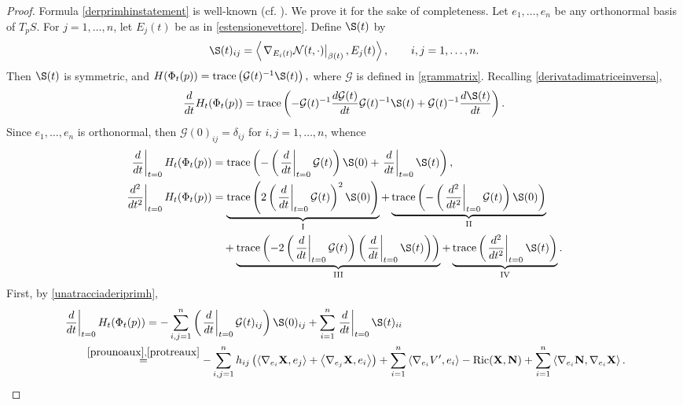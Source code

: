 \documentclass[11pt]{amsart}
\newcommand{\n}[1]{\nabla^\varepsilon_{ #1 }}
\newcommand{\N}{\mathcal N}
\renewcommand{\k}{\kappa}
\newcommand{\X}{\mathbf{X}}
\renewcommand{\n}{\mathbf{N}}
\newcommand{\G}{\mathcal G}
\DeclareMathOperator{\ric}{Ric}
\DeclareMathOperator{\trace}{trace}
\theoremstyle{definition}
\theoremstyle{remark}
\numberwithin{equation}{section}
\begin{document}
\begin{proof}
Formula \eqref{derprimhinstatement} is well-known (cf. \cite[Lemma 1.26]{MR4676392}). We prove it for the sake of completeness. 
    Let $e_1,\ldots,e_n$ be any orthonormal basis of $T_p S$. 
    For $j=1,\ldots,n$, let $E_j(t)$ be as in \eqref{estensionevettore}. Define $\S(t)$ by
    \begin{equation*}
       \S(t)_{ij}=\left\langle\left.\nabla_{E_i(t)}\N(t,\cdot)\right|_{\beta(t)},E_j(t)\right\rangle,\qquad i,j=1,\ldots,n.
    \end{equation*}
    Then $\S(t)$ is symmetric, and $       H(\Phi_t(p))=\trace\left(\G(t)^{-1}\S(t)\right),$
   where $\G$ is defined in \eqref{grammatrix}. 
   Recalling \eqref{derivatadimatriceinversa},
    \begin{equation*}
        \frac{d}{dt}H_t(\Phi_t(p))=\trace\left(-\G(t)^{-1}\frac{d\G(t)}{dt}\G(t)^{-1}\S(t)+\G(t)^{-1}\frac{d\S(t)}{dt}\right).
    \end{equation*}
Since $e_1,\ldots,e_n$ is orthonormal, then $\G(0)_{ij}=\delta_{ij}$ for $i,j=1,\ldots,n$, whence
\begin{align}
     \left.\frac{d}{dt}\right|_{t=0}H_t(\Phi_t(p))&=\trace\left(-\left(\left.\frac{d}{dt}\right|_{t=0}\G(t)\right)\S(0)+\left.\frac{d}{dt}\right|_{t=0}\S(t)\right),\label{unatracciaderiprimh}\\
      \left.\frac{d^2}{dt^2}\right|_{t=0}H_t(\Phi_t(p))&=\underbrace{\trace\left(2\left(\left.\frac{d}{dt}\right|_{t=0}\G(t)\right)^2\S(0)\right)}_{\mathrm{I}}+\underbrace{\trace\left(-\left(\left.\frac{d^2}{dt^2}\right|_{t=0}\G(t)\right)\S(0)\right)}_{\mathrm{II}}\label{quattrotraccedersech}\\
      &\quad+\underbrace{\trace\left(-2\left(\left.\frac{d}{dt}\right|_{t=0}\G(t)\right)\left(\left.\frac{d}{dt}\right|_{t=0}\S(t)\right)\right)}_{\mathrm{III}}+\underbrace{\trace\left(\left.\frac{d^2}{dt^2}\right|_{t=0}\S(t)\right)}_{\mathrm{IV}}\nonumber.
\end{align}
First, by \eqref{unatracciaderiprimh},
\begin{equation*}
    \begin{split}
         &\left.\frac{d}{dt}\right|_{t=0}H_t(\Phi_t(p))=-\sum_{i,j=1}^n\left(\left.\frac{d}{dt}\right|_{t=0}\G(t)_{ij}\right)\S(0)_{ij}+\sum_{i=1}^n\left.\frac{d}{dt}\right|_{t=0}\S(t)_{ii}\\
         &\qquad\overset{\eqref{prounoaux},\eqref{protreaux}}{=}-\sum_{i,j=1}^nh_{ij}\left(\left\langle\nabla_{e_i} \X,e_j\right\rangle+\left\langle \nabla_{e_j} \X,e_i\right\rangle\right)+\sum_{i=1}^n\left\langle \nabla_{e_i}V',e_i\right\rangle-\ric(\X,\n)+\sum_{i=1}^n\left\langle\nabla_{e_i}\n ,\nabla_{e_i}\X\right\rangle.

\end{split}
\end{equation*}
\end{proof}
\end{document}
